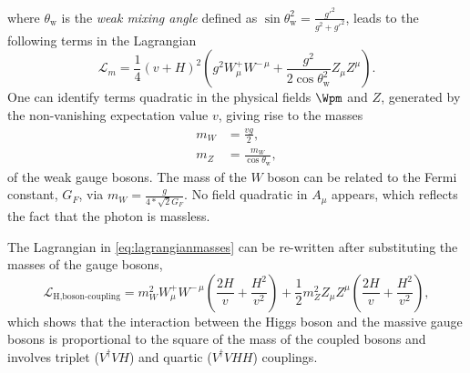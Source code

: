 where $\theta_\text{w}$ is the \emph{weak mixing angle} defined as $\sin\theta_\text{w}^2 = \frac{g'^2}{g^2+g'^2}$, leads to the following terms in the Lagrangian
\begin{equation}
  \mathcal{L}_m = \frac{1}{4} \left( v + H \right)^2  \left(g^2 W_\mu^+W^{-\,\mu} + \frac{g^2}{2\cos\theta_\text{w}^2} Z_\mu Z^\mu \right).
  \label{eq:lagrangianmasses}
\end{equation}
One can identify terms quadratic in the physical fields $\Wpm$ and $Z$, generated by the non-vanishing expectation value $v$, giving rise to the masses
\begin{align}
  m_W &= \frac{vg}{2}, \\
  m_Z &= \frac{m_W}{\cos \theta_\text{w}},
  \label{eq:boson-masses}
\end{align}
of the weak gauge bosons.
The mass of the $W$ boson can be related to the Fermi constant, $G_F$, via $m_W = \frac{g}{4 * \sqrt{2}G_F}$. 
No field quadratic in $A_\mu$ appears, which reflects the fact that the photon is massless.

The Lagrangian in \cref{eq:lagrangianmasses} can be re-written after substituting the masses of the gauge bosons,
\begin{equation}
  \mathcal{L}_{\text{H,boson-coupling}} = m_W^2 W_\mu^+W^{-\,\mu} \left( \frac{2H}{v} + \frac{H^2}{v^2} \right) + \frac{1}{2} m_Z^2 Z_\mu Z^\mu \left( \frac{2H}{v} + \frac{H^2}{v^2} \right),
  \label{eq:higgsbosoncoupling}
\end{equation}
which shows that the interaction between the Higgs boson and the massive gauge bosons is proportional to the square of the mass of the coupled bosons and involves triplet ($V^\dagger VH$) and quartic ($V^\dagger VHH$) couplings.


